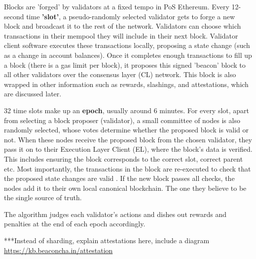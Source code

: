 Blocks are 'forged' by validators at a fixed tempo in PoS Ethereum. Every 12-second time \textbf{'slot'}, a pseudo-randomly selected validator gets to forge a new block and broadcast it to the rest of the network. Validators can choose which transactions in their mempool they will include in their next block. Validator client software executes these transactions locally, proposing a state change (such as a change in account balances). Once it completes enough transactions to fill up a block (there is a gas limit per block), it proposes this signed 'beacon' block to all other validators over the consensus layer (CL) network. This block is also wrapped in other information such as rewards, slashings, and attestations, which are discussed later.

32 time slots make up an \textbf{epoch}, usually around 6 minutes. For every slot, apart from selecting a block proposer (validator), a small committee of nodes is also randomly selected, whose votes determine whether the proposed block is valid or not. When these nodes receive the proposed block from the chosen validator, they pass it on to their Execution Layer Client (EL), where the block's data is verified. This includes ensuring the block corresponds to the correct slot, correct parent etc. Most importantly, the transactions in the block are re-executed to check that the proposed state changes are valid \cite{EthereumEthereum.org}. If the new block passes all checks, the nodes add it to their own local canonical blockchain. The one they believe to be the single source of truth. 

The algorithm judges each validator's actions and dishes out rewards and penalties at the end of each epoch accordingly. 

***Instead of sharding, explain attestations here, include a diagram \url{https://kb.beaconcha.in/attestation}




